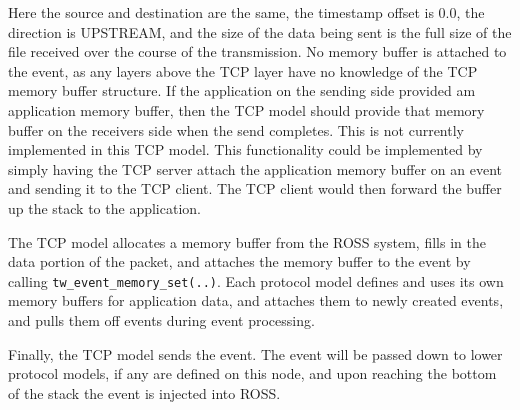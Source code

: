 \documentclass[12pt]{article}
\begin{document}
Here the source and destination are the same, the timestamp offset is 0.0, the
direction is UPSTREAM, and the size of the data being sent is the full size of
the file received over the course of the transmission.  No memory buffer is
attached to the event, as any layers above the TCP layer have no knowledge of
the TCP memory buffer structure.  If the application on the sending side
provided am application memory buffer, then the TCP model should provide that
memory buffer on the receivers side when the send completes.  This is not
currently implemented in this TCP model.  This functionality could be
implemented by simply having the TCP server attach the application memory
buffer on an event and sending it to the TCP client.  The TCP client would
then forward the buffer up the stack to the application.

The TCP model allocates a memory buffer from the ROSS system, fills in the
data portion of the packet, and attaches the memory buffer to the event by
calling {\tt tw\_event\_memory\_set(..)}.  Each protocol model defines and
uses its own memory buffers for application data, and attaches them to newly
created events, and pulls them off events during event processing.

Finally, the TCP model sends the event.  The event will be passed down to
lower protocol models, if any are defined on this node, and upon reaching the
bottom of the stack the event is injected into ROSS.
\end{document}
